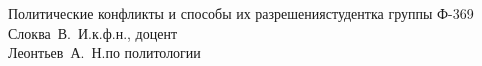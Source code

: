


\usepackage{color}
\usepackage[colorlinks,linkcolor=black,filecolor=blue,citecolor=darkgreen]{hyperref}


    {Политические конфликты и способы их разрешения}{студентка группы
    Ф-369\\Слоква~В.~И.}{к.ф.н., доцент\\Леонтьев~А.~Н.}{по политологии}
        
    \tableofcontents
    \thispagestyle{empty}
    \newpage
    
